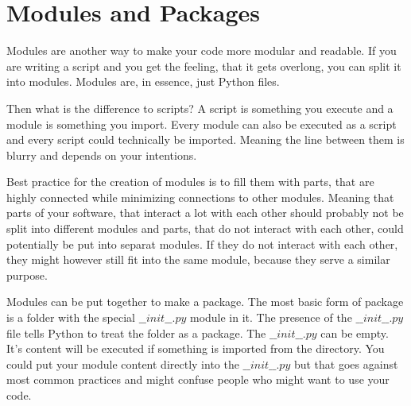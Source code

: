 \documentclass{article}
\begin{document}

\section{Modules and Packages}

Modules are another way to make your code more modular and readable.
If you are writing a script and you get the feeling, that it gets overlong,
you can split it into modules.
Modules are, in essence, just Python files.

Then what is the difference to scripts?
A script is something you execute and a module is something you import.
Every module can also be executed as a script and every script could
technically be imported.
Meaning the line between them is blurry and depends on your intentions.

Best practice for the creation of modules is to fill them with parts, that are
highly connected while minimizing connections to other modules.
Meaning that parts of your software, that interact a lot with each other
should probably not be split into different modules and parts, that do not interact with
each other, could potentially be put into separat modules.
If they do not interact with each other, they might however still fit into
the same module, because they serve a similar purpose.

Modules can be put together to make a package.
The most basic form of package is a folder with the special $\_\_init\_\_.py$
module in it.
The presence of the $\_\_init\_\_.py$ file tells Python to treat the folder as a
package.
The $\_\_init\_\_.py$ can be empty.
It's content will be executed if something is imported from the directory.
You could put your module content directly into the $\_\_init\_\_.py$ but
that goes against most common practices and might confuse people
who might want to use your code.
\end{document}
